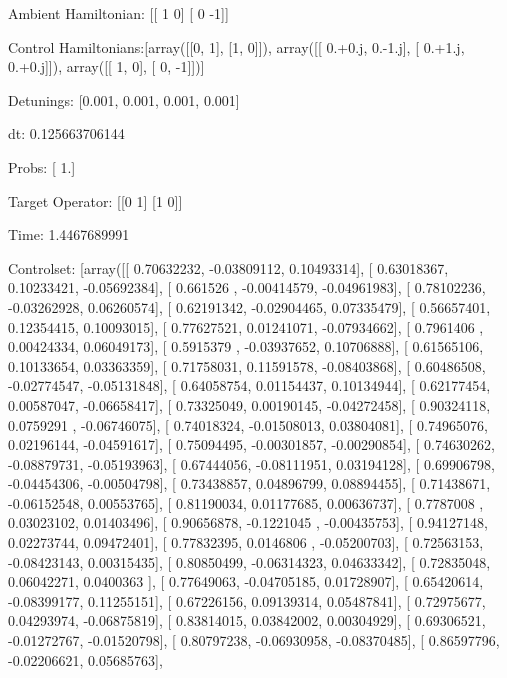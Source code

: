 \documentclass{article}
\begin{document}
    

\newpage

Ambient Hamiltonian: [[ 1  0]
 [ 0 -1]]

Control Hamiltonians:[array([[0, 1],
       [1, 0]]), array([[ 0.+0.j,  0.-1.j],
       [ 0.+1.j,  0.+0.j]]), array([[ 1,  0],
       [ 0, -1]])]

Detunings: [0.001, 0.001, 0.001, 0.001]

 dt: 0.125663706144

Probs: [ 1.]

Target Operator: [[0 1]
 [1 0]]

Time: 1.4467689991

Controlset: [array([[ 0.70632232, -0.03809112,  0.10493314],
       [ 0.63018367,  0.10233421, -0.05692384],
       [ 0.661526  , -0.00414579, -0.04961983],
       [ 0.78102236, -0.03262928,  0.06260574],
       [ 0.62191342, -0.02904465,  0.07335479],
       [ 0.56657401,  0.12354415,  0.10093015],
       [ 0.77627521,  0.01241071, -0.07934662],
       [ 0.7961406 ,  0.00424334,  0.06049173],
       [ 0.5915379 , -0.03937652,  0.10706888],
       [ 0.61565106,  0.10133654,  0.03363359],
       [ 0.71758031,  0.11591578, -0.08403868],
       [ 0.60486508, -0.02774547, -0.05131848],
       [ 0.64058754,  0.01154437,  0.10134944],
       [ 0.62177454,  0.00587047, -0.06658417],
       [ 0.73325049,  0.00190145, -0.04272458],
       [ 0.90324118,  0.0759291 , -0.06746075],
       [ 0.74018324, -0.01508013,  0.03804081],
       [ 0.74965076,  0.02196144, -0.04591617],
       [ 0.75094495, -0.00301857, -0.00290854],
       [ 0.74630262, -0.08879731, -0.05193963],
       [ 0.67444056, -0.08111951,  0.03194128],
       [ 0.69906798, -0.04454306, -0.00504798],
       [ 0.73438857,  0.04896799,  0.08894455],
       [ 0.71438671, -0.06152548,  0.00553765],
       [ 0.81190034,  0.01177685,  0.00636737],
       [ 0.7787008 ,  0.03023102,  0.01403496],
       [ 0.90656878, -0.1221045 , -0.00435753],
       [ 0.94127148,  0.02273744,  0.09472401],
       [ 0.77832395,  0.0146806 , -0.05200703],
       [ 0.72563153, -0.08423143,  0.00315435],
       [ 0.80850499, -0.06314323,  0.04633342],
       [ 0.72835048,  0.06042271,  0.0400363 ],
       [ 0.77649063, -0.04705185,  0.01728907],
       [ 0.65420614, -0.08399177,  0.11255151],
       [ 0.67226156,  0.09139314,  0.05487841],
       [ 0.72975677,  0.04293974, -0.06875819],
       [ 0.83814015,  0.03842002,  0.00304929],
       [ 0.69306521, -0.01272767, -0.01520798],
       [ 0.80797238, -0.06930958, -0.08370485],
       [ 0.86597796, -0.02206621,  0.05685763],
\end{document}
